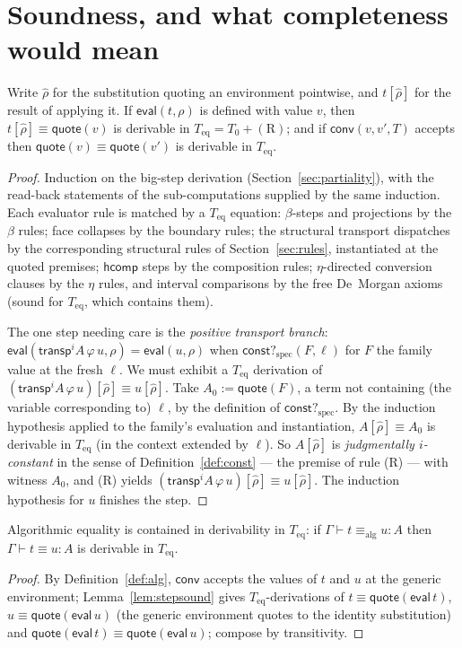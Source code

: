 \documentclass{lmcs}
\newcommand{\transp}{\mathsf{transp}}
\newcommand{\hcomp}{\mathsf{hcomp}}
\renewcommand{\conv}{\equiv}
\newcommand{\aconv}{\equiv_{\mathrm{alg}}}
\newcommand{\evalop}{\mathsf{eval}}
\newcommand{\constspec}{\mathsf{const?}_{\mathrm{spec}}}
\newcommand{\convop}{\mathsf{conv}}
\newcommand{\quo}{\mathsf{quote}}
\begin{document}
\section{Soundness, and what completeness would mean}
\label{sec:soundness}

\begin{lem}\label{lem:stepsound}
  Write $\hat\rho$ for the substitution quoting an environment
  pointwise, and $t[\hat\rho]$ for the result of applying it.  If
  $\evalop(t, \rho)$ is defined with value $v$, then
  $t[\hat\rho] \conv \quo(v)$ is derivable in
  $T_{\mathrm{eq}} = T_0 + (\mathrm{R})$; and if
  $\convop(v, v', T)$ accepts then $\quo(v) \conv \quo(v')$ is
  derivable in $T_{\mathrm{eq}}$.
\end{lem}
\begin{proof}
  Induction on the big-step derivation
  (Section~\ref{sec:partiality}), with the read-back statements of
  the sub-computations supplied by the same induction.  Each
  evaluator rule is matched by a $T_{\mathrm{eq}}$ equation:
  $\beta$-steps and projections by the $\beta$ rules; face collapses
  by the boundary rules; the structural transport dispatches by the
  corresponding structural rules of Section~\ref{sec:rules},
  instantiated at the quoted premises; $\hcomp$ steps by the
  composition rules; $\eta$-directed conversion clauses by the
  $\eta$ rules, and interval comparisons by the free De~Morgan
  axioms (sound for $T_{\mathrm{eq}}$, which contains them).

  The one step needing care is the \emph{positive transport branch}:
  $\evalop(\transp^i A\,\varphi\,u, \rho) = \evalop(u,\rho)$ when
  $\constspec(F, \ell)$ for $F$ the family value at the fresh
  $\ell$.  We must exhibit a $T_{\mathrm{eq}}$ derivation of
  $(\transp^i A\,\varphi\,u)[\hat\rho] \conv u[\hat\rho]$.  Take
  $A_0 := \quo(F)$, a term not containing (the variable
  corresponding to) $\ell$, by the definition of $\constspec$.  By
  the induction hypothesis applied to the family's evaluation and
  instantiation, $A[\hat\rho] \conv A_0$ is derivable in
  $T_{\mathrm{eq}}$ (in the context extended by $\ell$).  So
  $A[\hat\rho]$ is \emph{judgmentally $i$-constant} in the sense of
  Definition~\ref{def:const} --- the premise of rule (R) --- with
  witness $A_0$, and (R) yields
  $(\transp^i A\,\varphi\,u)[\hat\rho] \conv u[\hat\rho]$.  The
  induction hypothesis for $u$ finishes the step.
\end{proof}

\begin{thm}[Soundness]\label{thm:soundness}
  Algorithmic equality is contained in derivability in
  $T_{\mathrm{eq}}$: if $\Gamma \vdash t \aconv u : A$ then
  $\Gamma \vdash t \conv u : A$ is derivable in $T_{\mathrm{eq}}$.
\end{thm}
\begin{proof}
  By Definition~\ref{def:alg}, $\convop$ accepts the values of $t$
  and $u$ at the generic environment; Lemma~\ref{lem:stepsound}
  gives $T_{\mathrm{eq}}$-derivations of
  $t \conv \quo(\evalop\,t)$, $u \conv \quo(\evalop\,u)$
  (the generic environment quotes to the identity substitution) and
  $\quo(\evalop\,t) \conv \quo(\evalop\,u)$; compose by
  transitivity.
\end{proof}
\end{document}
